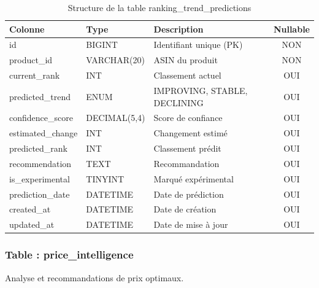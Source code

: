 \documentclass[12pt,a4paper]{report}
\begin{document}
\begin{table}[H]
    \centering
    \caption{Structure de la table ranking\_trend\_predictions}
    \begin{tabularx}{\textwidth}{llXc}
        \toprule
        \textbf{Colonne} & \textbf{Type} & \textbf{Description} & \textbf{Nullable} \\
        \midrule
        id & BIGINT & Identifiant unique (PK) & NON \\
        product\_id & VARCHAR(20) & ASIN du produit & NON \\
        current\_rank & INT & Classement actuel & OUI \\
        predicted\_trend & ENUM & IMPROVING, STABLE, DECLINING & OUI \\
        confidence\_score & DECIMAL(5,4) & Score de confiance & OUI \\
        estimated\_change & INT & Changement estimé & OUI \\
        predicted\_rank & INT & Classement prédit & OUI \\
        recommendation & TEXT & Recommandation & OUI \\
        is\_experimental & TINYINT & Marqué expérimental & OUI \\
        prediction\_date & DATETIME & Date de prédiction & OUI \\
        created\_at & DATETIME & Date de création & OUI \\
        updated\_at & DATETIME & Date de mise à jour & OUI \\
        \bottomrule
    \end{tabularx}
    \label{tab:ranking_trend_predictions}
\end{table}

\subsubsection{Table : price\_intelligence}

Analyse et recommandations de prix optimaux.
\end{document}
